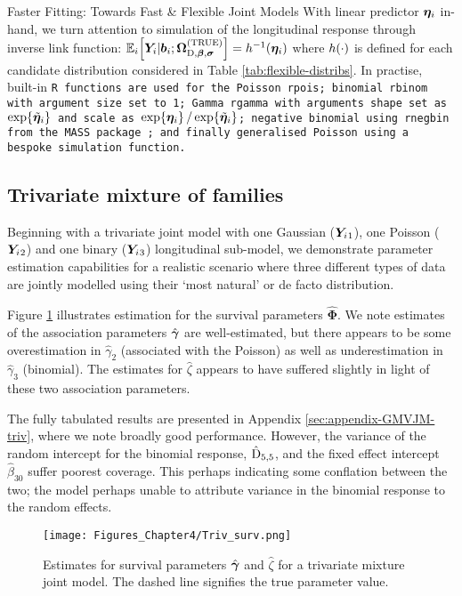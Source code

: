 \begin{chapter}{\label{cha:flexible}Faster Fitting: Towards Fast \& Flexible Joint Models}
With linear predictor $\bm{\eta}_i$ in-hand, we turn attention to simulation of the longitudinal response through inverse link function: $\mathbb{E}_i\!\left[\bm{Y}_i|\bm{b}_i; \bm{\mathrm{\Omega}}_{\mathrm{D},\bm{\beta},\bm{\sigma}}^{(\mathrm{TRUE})}\right]=h^{-1}\!\left(\bm{\eta}_i\right)$ where $h\!\left(\cdot\right)$ is defined for each candidate distribution considered in Table \ref{tab:flexible-distribs}. In practise, built-in \tt{R} functions are used for the Poisson \tt{rpois}; binomial \tt{rbinom} with argument \tt{size} set to 1; Gamma \tt{rgamma} with arguments \tt{shape} set as $\exp\!\left\{\tilde{\bm{\eta}}_{i}\right\}$ and \tt{scale} as $\exp\!\left\{\bm{\eta}_i\right\}/\exp\!\left\{\tilde{\bm{\eta}}_{i}\right\}$; negative binomial using \tt{rnegbin} from the \tt{MASS} package \citep{R-MASS}; and finally generalised Poisson using a bespoke simulation function.

\subsection{Trivariate mixture of families}\label{sec:flexible-sim-triv}
Beginning with a trivariate joint model with one Gaussian ($\bm{Y}_i{_1}$), one Poisson ($\bm{Y}_i{_2}$) and one binary ($\bm{Y}_i{_3}$) longitudinal sub-model, we demonstrate parameter estimation capabilities for a realistic scenario where three different types of data are jointly modelled using their `most natural' or de facto distribution.

Figure \ref{fig:flexible-sims-triv} illustrates estimation for the survival parameters $\hat{\bm{\Phi}}$. We note estimates of the association parameters $\hat{\bm{\gamma}}$ are well-estimated, but there appears to be some overestimation in $\hat{\gamma}_2$ (associated with the Poisson) as well as underestimation in $\hat{\gamma}_3$ (binomial). The estimates for $\hat{\zeta}$ appears to have suffered slightly in light of these two association parameters. 

The fully tabulated results are presented in Appendix \ref{sec:appendix-GMVJM-triv}, where we note broadly good performance. However, the variance of the random intercept for the binomial response, $\hat{\mathrm{D}}_{5,5}$, and the fixed effect intercept $\hat{\beta}_{30}$ suffer poorest coverage. This perhaps indicating some conflation between the two; the model perhaps unable to attribute variance in the binomial response to the random effects.

\begin{figure}
    \centering
    \texttt{[image: Figures\_Chapter4/Triv\_surv.png]}
    \caption{Estimates for survival parameters $\hat{\bm{\gamma}}$ and $\hat{\zeta}$ for a trivariate mixture joint model. The dashed line signifies the true parameter value.}
    \label{fig:flexible-sims-triv}
\end{figure}


\end{chapter}
